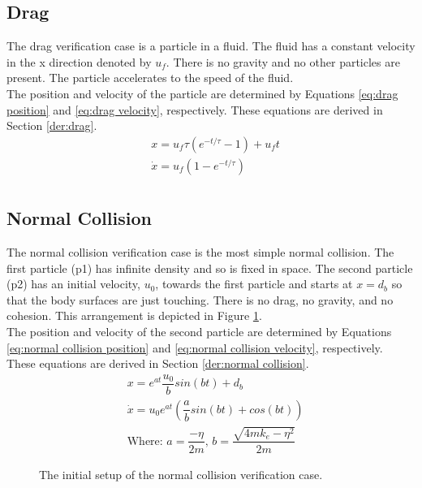 \documentclass[a4paper,11pt,titlepage]{report}
\begin{document}
\subsection{Drag}
\label{sec:drag verification}
The drag verification case is a particle in a fluid. The fluid has a constant velocity in the x direction denoted by $u_f$. There is no gravity and no other particles are present. The particle accelerates to the speed of the fluid.
\\The position and velocity of the particle are determined by Equations \ref{eq:drag position} and \ref{eq:drag velocity}, respectively. These equations are derived in Section \ref{der:drag}.
\begin{align}
&x = u_f \tau (e^{-t/\tau} - 1) + u_f t \label{eq:drag position} \\
&\dot{x} = u_f (1 - e^{-t/\tau}) \label{eq:drag velocity} \\
\end{align}
\subsection{Normal Collision}
\label{sec:normal collision verification}
The normal collision verification case is the most simple normal collision. The first particle (p1) has infinite density and so is fixed in space. The second particle (p2) has an initial velocity, $u_0$, towards the first particle and starts at $x = d_b$ so that the body surfaces are just touching. There is no drag, no gravity, and no cohesion. This arrangement is depicted in Figure \ref{fig:normal collision}.
\\The position and velocity of the second particle are determined by Equations \ref{eq:normal collision position} and \ref{eq:normal collision velocity}, respectively. These equations are derived in Section \ref{der:normal collision}.
\begin{align}
&x = e^{at} \dfrac{u_0}{b} sin(bt) + d_b \label{eq:normal collision position} \\
&\dot{x} = u_0 e^{at} (\dfrac{a}{b} sin(bt) + cos(bt)) \label{eq:normal collision velocity} \\
&\text{Where: } a = \dfrac{-\eta}{2m} \text{,    } b = \dfrac{\sqrt{4mk_e - \eta ^ 2}}{2m} \nonumber
\end{align}
\begin{figure}[!ht]
\centering

\caption{The initial setup of the normal collision verification case.}
\label{fig:normal collision}
\end{figure}
\end{document}
